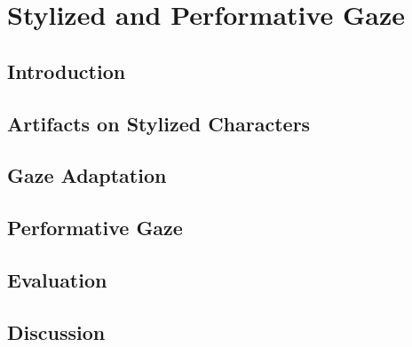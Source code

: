\pagestyle{deposit}

\chapter{Stylized and Performative Gaze}
\label{cha:StylizedGaze}

\section{Introduction}
\label{sec:StylizedGazeIntro}
%

\section{Artifacts on Stylized Characters}
\label{sec:StylizedGazeArtifacts}
%

\section{Gaze Adaptation}
\label{sec:StylizedGazeAdaptation}
%

\section{Performative Gaze}
\label{sec:PerformativeGaze}
%

\section{Evaluation}
\label{sec:StylizedGazeEvaluation}
%

\section{Discussion}
\label{sec:StylizedGazeDiscussion}
%

